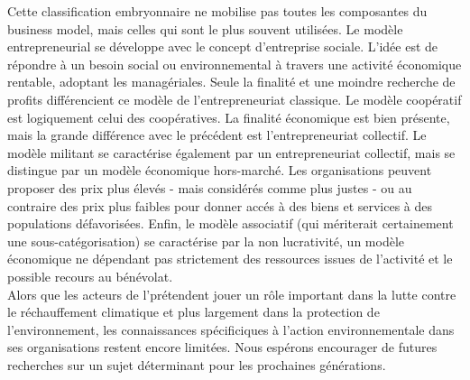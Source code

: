           Cette classification embryonnaire ne mobilise pas toutes les composantes du business model, mais celles qui sont le plus souvent utilisées. Le modèle entrepreneurial se développe avec le concept d'entreprise sociale. L'idée est de répondre à un besoin social ou environnemental à travers une activité économique rentable, adoptant les  managériales. Seule la finalité et une moindre recherche de profits différencient ce modèle de l'entrepreneuriat classique. Le modèle coopératif est logiquement celui des coopératives. La finalité économique est bien présente, mais la grande différence avec le précédent est l'entrepreneuriat collectif. Le modèle militant se caractérise également par un entrepreneuriat collectif, mais se distingue par un modèle économique hors-marché. Les organisations peuvent proposer des prix plus élevés - mais considérés comme plus justes - ou au contraire des prix plus faibles pour donner accés à des biens et services à des populations défavorisées. Enfin, le modèle associatif (qui mériterait certainement une sous-catégorisation) se caractérise par la non lucrativité, un modèle économique ne dépendant pas strictement des ressources issues de l'activité et le possible recours au bénévolat. \\

          Alors que les acteurs de l'\ess prétendent jouer un rôle important dans la lutte contre le réchauffement climatique et plus largement dans la protection de l'environnement, les connaissances spécificiques à l'action environnementale dans ses organisations restent encore limitées. Nous espérons encourager de futures recherches sur un sujet déterminant pour les prochaines générations.

